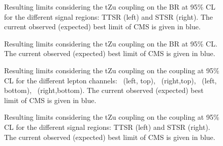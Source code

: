 \begin{figure}[ht]
	\centering
	\caption{Resulting limits considering the tZu coupling on the BR at 95\%  CL for the different signal regions: TTSR (left) and STSR (right). The current observed (expected) best limit of CMS is given in blue.}
	\label{fig:exclusionlimitbrfcnczutttst}
\end{figure}


\begin{figure}[ht]
	\centering
	\caption{Resulting limits considering the tZu coupling on the BR at 95\%  CL. The current observed (expected) best limit of CMS is given in blue.}
	\label{fig:exclusionlimitbrfcnczut}
\end{figure}


\begin{figure}[ht]
	\centering
	\caption{Resulting limits considering the tZu coupling on the coupling at 95\%  CL for the different lepton channels: \mumumu\ (left, top), \emumu\ (right,top), \eee\ (left, bottom), \eemu\ (right,bottom). The current observed (expected) best limit of CMS is given in blue.}
	\label{fig:exclusionlimitbrfcnczutchannelsc}
\end{figure}

\begin{figure}[ht]
	\centering
	\caption{Resulting limits considering the tZu coupling on the coupling at 95\%  CL for the different signal regions: TTSR (left) and STSR (right). The current observed (expected) best limit of CMS is given in blue.}
	\label{fig:exclusionlimitbrfcnczutttstc}
\end{figure}



